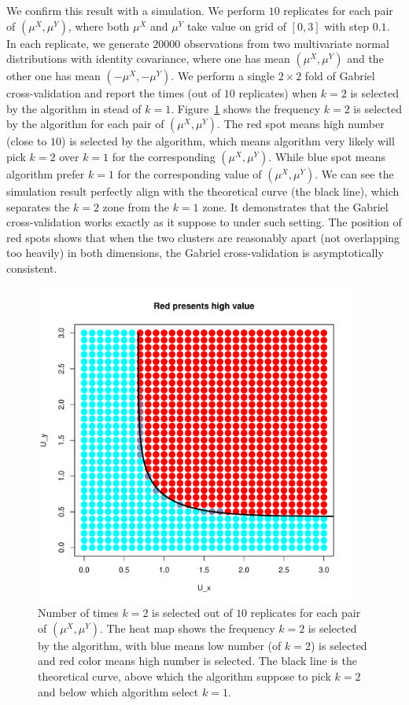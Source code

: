 \documentclass[11pt]{article}
\newcommand{\muX}{\mu^{X}}
\newcommand{\muY}{\mu^{Y}}
\begin{document}
We confirm this result with a simulation.  We perform $10$ replicates for each pair of $(\mu^X, \mu^Y)$, where both $\mu^X$ and $\mu^Y$ take value on grid of $[0,3]$ with step $0.1$.  In each
replicate, we generate $20000$ observations from two multivariate normal distributions with identity covariance, where one has mean $(\muX, \muY)$ and the other one has mean $(-\muX, -\muY)$.
We perform a single $2 \times 2$ fold of Gabriel cross-validation and report the
times (out of $10$ replicates) when $k=2$ is selected by the algorithm in stead of $k=1$. Figure~\ref{fig:overlap-color_plot} shows the frequency $k=2$ is selected by the algorithm for each pair of $(\mu^X, \mu^Y)$. The red spot means high number (close to $10$) is selected by the algorithm, which means algorithm very likely will pick $k=2$ over $k=1$ for the corresponding $(\mu^X, \mu^Y)$. While blue spot means algorithm prefer $k=1$ for the corresponding value of $(\mu^X, \mu^Y)$. We can see the simulation result perfectly align with the theoretical curve (the black line), which separates the $k=2$ zone from the $k=1$ zone. It demonstrates that the Gabriel cross-validation works exactly as it suppose to under such setting. The position of red spots shows that when the two clusters are reasonably apart (not overlapping too heavily) in both dimensions, the Gabriel cross-validation is asymptotically consistent.

\begin{figure}[H]
\centering
\includegraphics[width=25pc]{demo/overlap/color_plot.pdf}
\caption{Number of times $k=2$ is selected out of $10$ replicates for each pair of $(\muX, \muY)$. The heat map shows the frequency $k=2$ is selected by the algorithm, with blue means low number (of $k=2$) is selected and red color means high number is selected. The black line is the theoretical curve, above which the algorithm suppose to pick $k=2$ and below which algorithm select $k=1$.  }
\label{fig:overlap-color_plot}
\end{figure}
\end{document}
